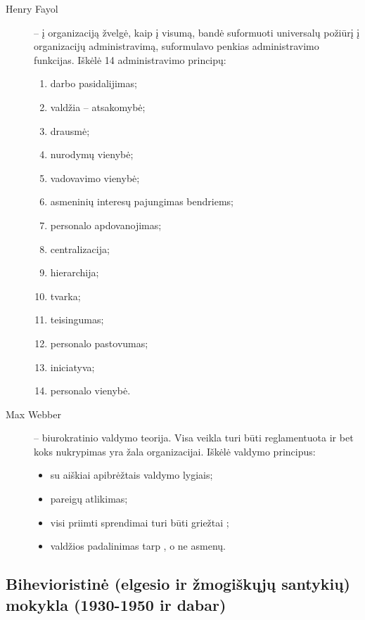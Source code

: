 \begin{description}
  \item[Henry Fayol] – į organizaciją žvelgė, kaip į visumą, bandė 
    suformuoti universalų požiūrį į organizacijų administravimą,
    suformulavo penkias administravimo funkcijas. Iškėlė 14 administravimo
    principų:
    \begin{enumerate}
      \item darbo pasidalijimas;
      \item valdžia – atsakomybė;
      \item drausmė;
      \item nurodymų vienybė;
      \item vadovavimo vienybė;
      \item asmeninių interesų pajungimas bendriems;
      \item personalo apdovanojimas;
      \item centralizacija;
      \item hierarchija;
      \item tvarka;
      \item teisingumas;
      \item personalo pastovumas;
      \item iniciatyva;
      \item personalo vienybė.
    \end{enumerate}
  \item[Max Webber] – biurokratinio valdymo teorija. Visa veikla turi
    būti reglamentuota ir bet koks nukrypimas yra žala organizacijai.
    Iškėlė valdymo principus:
    \begin{itemize}
      \item {} su aiškiai apibrėžtais valdymo lygiais;
      \item {} pareigų atlikimas;
      \item visi priimti sprendimai turi būti griežtai ;
      \item valdžios padalinimas tarp , o ne asmenų.
    \end{itemize}
\end{description}

\subsection{Bihevioristinė (elgesio ir žmogiškųjų santykių) mokykla
(1930-1950 ir dabar)}

